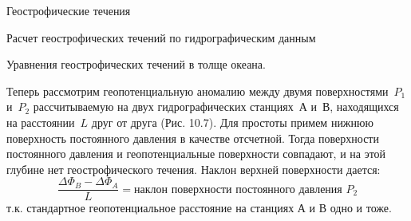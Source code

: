 \begin{chapter}{Геострофические течения}
\begin{section}{Расчет геострофических течений по гидрографическим данным}
\begin{paragraph}{Уравнения геострофических течений в толще океана.}

Теперь рассмотрим геопотенциальную аномалию между двумя
поверхностями~$P_1$ и~$P_2$ рассчитываемую на двух гидрографических
станциях~А и~В, находящихся на расстоянии~$L$ друг от друга
(Рис. 10.7). Для простоты примем нижнюю поверхность постоянного
давления в качестве отсчетной. Тогда поверхности постоянного давления
и геопотенциальные поверхности совпадают, и на этой глубине нет
геострофического течения. Наклон верхней поверхности дается:
\begin{displaymath}
 \frac{\Delta\Phi_B - \Delta\Phi_A}{L} 
  =\text{наклон поверхности постоянного давления $P_2$}
\end{displaymath}
т.к. стандартное геопотенциальное расстояние на станциях А и В одно и тоже.


\end{paragraph}
\end{section}
\end{chapter}
